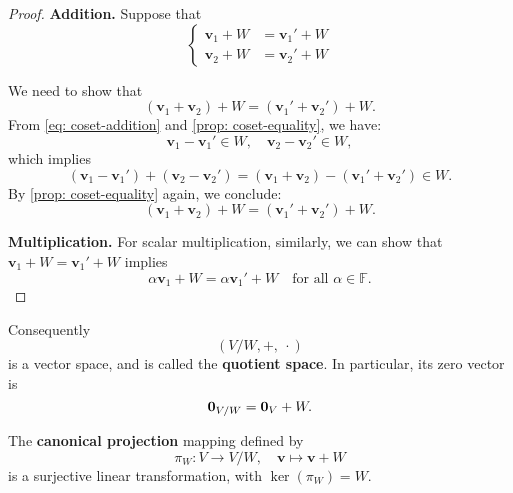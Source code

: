 \begin{proof}
\textbf{Addition.} Suppose that
\begin{equation}\label{eq: coset-addition}
\left\{
\begin{aligned}
\mathbf{v}_1 + W &= \mathbf{v}_1' + W \\
\mathbf{v}_2 + W &= \mathbf{v}_2' + W
\end{aligned}
\right.
\end{equation}

We need to show that
\[
(\mathbf{v}_1 + \mathbf{v}_2) + W = (\mathbf{v}_1' + \mathbf{v}_2') + W.
\]
From \eqref{eq: coset-addition} and \autoref{prop: coset-equality}, we have:
\[
\mathbf{v}_1 - \mathbf{v}_1' \in W, \quad \mathbf{v}_2 - \mathbf{v}_2' \in W,
\]
which implies
\[
(\mathbf{v}_1 - \mathbf{v}_1') + (\mathbf{v}_2 - \mathbf{v}_2') = (\mathbf{v}_1 + \mathbf{v}_2) - (\mathbf{v}_1' + \mathbf{v}_2') \in W.
\]
By \autoref{prop: coset-equality} again, we conclude:
\[
(\mathbf{v}_1 + \mathbf{v}_2) + W = (\mathbf{v}_1' + \mathbf{v}_2') + W.
\]

\textbf{Multiplication.} For scalar multiplication, similarly, we can show that \( \mathbf{v}_1 + W = \mathbf{v}_1' + W \) implies
\[
\alpha \mathbf{v}_1 + W = \alpha \mathbf{v}_1' + W \quad \text{for all } \alpha \in \mathbb{F}.
\]
\end{proof}

Consequently
$$(V/W, +,\ \cdot)$$
is a vector space, and is called the {\bf quotient space}. In particular, its zero vector is
$${\bf 0}_{V/W} = {\bf 0}_V + W.$$


\begin{proposition}\label{prop:canonical-projection}
The {\bf canonical projection} mapping defined by
\[
\pi_W : V \to V/W, \quad \mathbf{v} \mapsto \mathbf{v} + W
\]
is a surjective linear transformation, with \( \ker(\pi_W) = W \).
\end{proposition}

